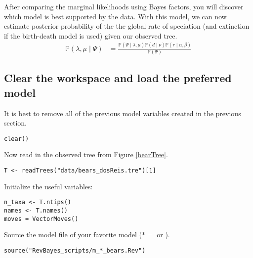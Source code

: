 After comparing the marginal likelihoods using Bayes factors, you will discover which model is best supported by the data. 
With this model, we can now estimate posterior probability of the the global rate of speciation (and extinction if the birth-death model is used) given our observed tree.
\begin{align}\label{bayesTher2}
\mathbb{P}(\lambda, \mu \mid \Psi) &= \frac{\mathbb{P}(\Psi \mid \lambda, \mu)\mathbb{P}(d \mid \nu)\mathbb{P}(r \mid \alpha, \beta)}{\mathbb{P}(\Psi)}
\end{align}




\subsection{Clear the workspace and load the preferred model}

It is best to remove all of the previous model variables created in the previous section.
{\tt \begin{snugshade*}
\begin{lstlisting}
clear()
\end{lstlisting}
\end{snugshade*}}


Now read in the observed tree from Figure \ref{bearTree}. 
{\tt \begin{snugshade*}
\begin{lstlisting}
T <- readTrees("data/bears_dosReis.tre")[1]
\end{lstlisting}
\end{snugshade*}}

Initialize the useful variables:
{\tt \begin{snugshade*}
\begin{lstlisting}
n_taxa <- T.ntips()
names <- T.names()
moves = VectorMoves() 
\end{lstlisting}
\end{snugshade*}}



Source the model file of your favorite model ($* = $  or ).
{\tt \begin{snugshade*}
\begin{lstlisting}
source("RevBayes_scripts/m_*_bears.Rev")
\end{lstlisting}
\end{snugshade*}}

